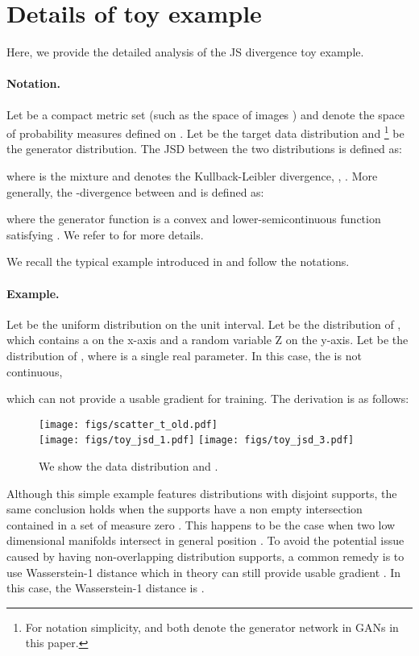 \documentclass{article} \usepackage{iclr2023_conference,times}
\theoremstyle{plain}
\theoremstyle{definition}
\theoremstyle{remark}
\begin{document}
\section{Details of toy example}

Here, we provide the detailed analysis of the JS divergence toy example. 



\paragraph{Notation.} Let  be a compact metric set (such as the space of images ) and  denote the space of probability measures defined on . Let  be the target data distribution and  \footnote{For notation simplicity,  and  both denote the generator network in GANs in this paper.} be the generator distribution. The JSD between the two distributions  is defined as:

where  is the mixture  and  denotes the Kullback-Leibler divergence, , . More generally, the -divergence \citep{nowozin2016f-gan} between  and  is defined as:

where the generator function  is a convex and lower-semicontinuous function satisfying
. We refer to \citet{nowozin2016f-gan} for more details.

We recall the typical example introduced in \citet{Arjovsky2017TowardsPM} and follow the notations.
\paragraph{Example.} Let  be the uniform distribution on the unit interval. Let  be the distribution of , which contains a  on the x-axis and a random variable Z on the y-axis. Let  be the distribution of , where  is a single real parameter. In this case, the  is not continuous, 

which can not provide a usable gradient for training. The derivation is as follows: 


\begin{figure}[!t]
    \centering
    \texttt{[image: figs/scatter\_t\_old.pdf]}\\
    \texttt{[image: figs/toy\_jsd\_1.pdf]}
    \texttt{[image: figs/toy\_jsd\_3.pdf]} 
    \caption{\small We show the data distribution and . }
    \label{fig:wgan_example_old}
\end{figure}

Although this simple example features distributions with disjoint supports, the same conclusion holds when the supports have a non empty intersection contained in a set of measure zero \citep{Arjovsky2017TowardsPM}. This happens to be the case when two low dimensional manifolds intersect in general position \citep{Arjovsky2017TowardsPM}. To avoid the potential issue caused by having non-overlapping distribution supports, a common remedy is to use Wasserstein-1 distance which in theory can still provide usable gradient \citep{Arjovsky2017TowardsPM,arjovsky2017wasserstein}. In this case, the Wasserstein-1 distance is . 
\end{document}
